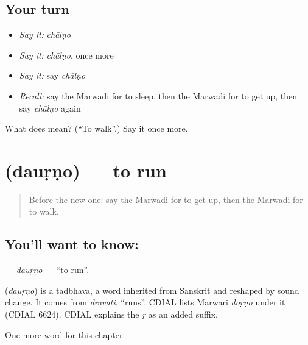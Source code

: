 \subsection*{Your turn}
\begin{itemize}
\raggedright
  \item \emph{Say it:} \emph{chālṇo}
  \item \emph{Say it:} \emph{chālṇo}, once more
  \item \emph{Say it:} say \emph{chālṇo}
  \item \emph{Recall:} say the Marwadi for to sleep, then the Marwadi for to get up, then say \emph{chālṇo} again
\end{itemize}

\begin{tcolorbox}[breakable,colback=teal!4,colframe=teal!35!black,title={Before you move on}]
What does  mean? (\textquotedblleft{}To walk\textquotedblright{}.) Say it once more.
\end{tcolorbox}
\section[\texorpdfstring{\mw{दौड़णो} (dauṛṇo)}{दौड़णो (dauṛṇo)}]{ (dauṛṇo) — to run}

\label{lesson:MW-C52-daurno}



\begin{quote}
Before the new one: say the Marwadi for to get up, then the Marwadi for to walk.
\end{quote}

\subsection*{You'll want to know: }
\textbf{} — \emph{dauṛṇo} — \textquotedblleft{}to run\textquotedblright{}.

\begin{cousinweb}
\textbf{} (\emph{dauṛṇo}) is a tadbhava, a word inherited from Sanskrit and reshaped by sound change. It comes from \emph{dravati}, \textquotedblleft{}runs\textquotedblright{}. CDIAL lists Marwari \emph{doṛṇo} under it (CDIAL 6624). CDIAL explains the \emph{ṛ} as an added suffix.
\end{cousinweb}

\begin{grammarlens}[title={What you've built}]
One more word for this chapter.
\end{grammarlens}

